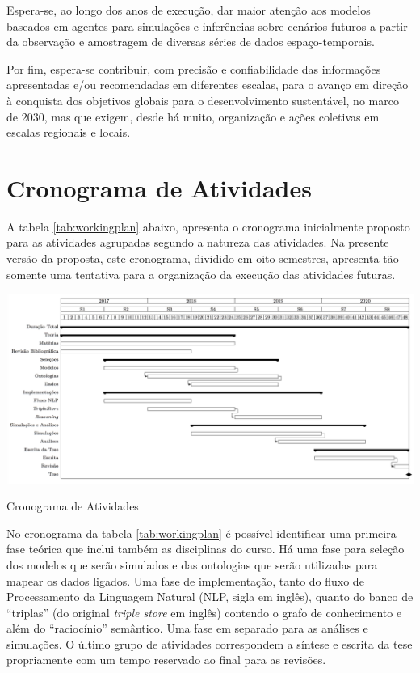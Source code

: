 \documentclass[
	12pt,				%
	openany,			%
	oneside,			%
	a4paper,			%
	english,			%
	french,				%
	spanish,			%
	brazil,				%
	]{abntex2}
\begin{document}
Espera-se, ao longo dos anos de execução, dar maior atenção aos modelos baseados em agentes para simulações e inferências sobre cenários futuros a partir da observação e amostragem de diversas séries de dados espaço-temporais.

Por fim, espera-se contribuir, com precisão e confiabilidade das informações apresentadas e/ou recomendadas em diferentes escalas, para o avanço em direção à conquista dos objetivos globais para o desenvolvimento sustentável, no marco de 2030, mas que exigem, desde há muito, organização e ações coletivas em escalas regionais e locais.

\newpage
\section{Cronograma de Atividades}

A tabela \ref{tab:workingplan} abaixo, apresenta o cronograma inicialmente proposto para as atividades agrupadas segundo a natureza das atividades. Na presente versão da proposta, este cronograma, dividido em oito semestres, apresenta tão somente uma tentativa para a organização da execução das atividades futuras.

	\begin{table}[h]
		\includegraphics[width=1.00\columnwidth]{timetable_png} 
		\caption[Cronograma de Atividades]{Cronograma de Atividades} 
		\label{tab:workingplan} 
	\end{table}
No cronograma da tabela \ref{tab:workingplan} é possível identificar uma primeira fase teórica que inclui também as disciplinas do curso. Há uma fase para seleção dos modelos que serão simulados e das ontologias que serão utilizadas para mapear os dados ligados. Uma fase de implementação, tanto do fluxo de Processamento da Linguagem Natural (NLP, sigla em inglês), quanto do banco de ``triplas'' (do original \emph{triple store} em inglês) contendo o grafo de conhecimento e além do ``raciocínio'' semântico. Uma fase em separado para as análises e simulações. O último grupo de atividades correspondem a síntese e escrita da tese propriamente com um tempo reservado ao final para as revisões.
\end{document}
